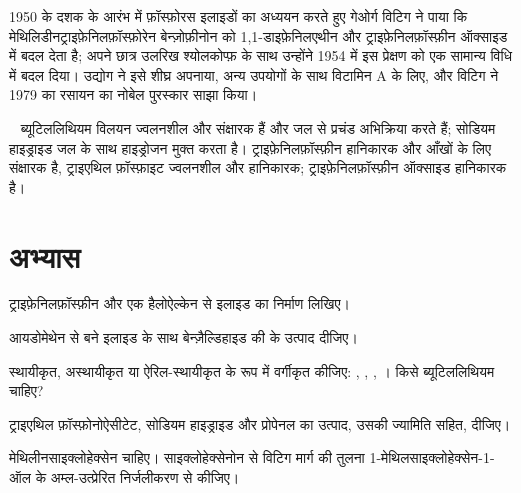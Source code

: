 \begin{history}[वह इलाइड जो अभिकर्मक बन गया]
1950 के दशक के आरंभ में फ़ॉस्फ़ोरस इलाइडों का अध्ययन करते हुए गेओर्ग विटिग ने पाया कि मेथिलिडीनट्राइफ़ेनिलफ़ॉस्फ़ोरेन
बेन्ज़ोफ़ीनोन को 1,1-डाइफ़ेनिलएथीन और ट्राइफ़ेनिलफ़ॉस्फ़ीन ऑक्साइड में बदल देता है; अपने छात्र उलरिख
श्योलकोप्फ़ के साथ उन्होंने 1954 में इस प्रेक्षण को एक सामान्य विधि में बदल दिया। उद्योग ने इसे शीघ्र अपनाया,
अन्य उपयोगों के साथ विटामिन A के लिए, और विटिग ने 1979 का रसायन का नोबेल पुरस्कार साझा किया।
\end{history}

\begin{safety}{\,\,\,}
ब्यूटिललिथियम विलयन ज्वलनशील और संक्षारक हैं और जल से प्रचंड अभिक्रिया करते हैं; सोडियम हाइड्राइड
जल के साथ हाइड्रोजन मुक्त करता है। ट्राइफ़ेनिलफ़ॉस्फ़ीन हानिकारक और आँखों के लिए संक्षारक है, ट्राइएथिल
फ़ॉस्फ़ाइट ज्वलनशील और हानिकारक; ट्राइफ़ेनिलफ़ॉस्फ़ीन ऑक्साइड हानिकारक है।
\end{safety}

\section{अभ्यास}

\begin{exercise}[$\star$]\label{exo:b2:wittig:1}
ट्राइफ़ेनिलफ़ॉस्फ़ीन और एक हैलोऐल्केन से इलाइड  का निर्माण लिखिए।
\end{exercise}

\begin{exercise}[$\star$]\label{exo:b2:wittig:2}
आयडोमेथेन से बने इलाइड के साथ बेन्ज़ैल्डिहाइड की  के उत्पाद दीजिए।
\end{exercise}

\begin{exercise}[$\star$]\label{exo:b2:wittig:3}
स्थायीकृत, अस्थायीकृत या ऐरिल-स्थायीकृत के रूप में वर्गीकृत कीजिए: , ,
, । किसे ब्यूटिललिथियम चाहिए?
\end{exercise}

\begin{exercise}[$\star$]\label{exo:b2:wittig:4}
ट्राइएथिल फ़ॉस्फ़ोनोऐसीटेट, सोडियम हाइड्राइड और प्रोपेनल का उत्पाद, उसकी ज्यामिति सहित, दीजिए।
\end{exercise}

\begin{exercise}[$\star\star$]\label{exo:b2:wittig:5}
मेथिलीनसाइक्लोहेक्सेन चाहिए। साइक्लोहेक्सेनोन से विटिग मार्ग की तुलना 1-मेथिलसाइक्लोहेक्सेन-1-ऑल के अम्ल-उत्प्रेरित
निर्जलीकरण से कीजिए।
\end{exercise}


